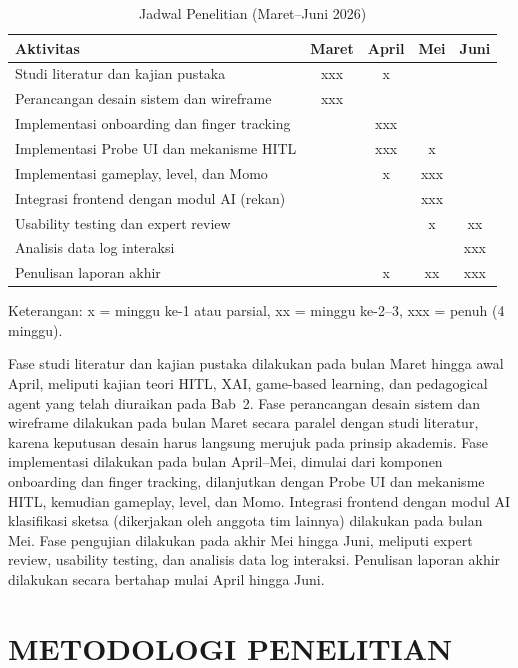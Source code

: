 \documentclass[10pt,twoside,openright]{report}
\begin{document}
\begin{table}[H]
\centering
\caption{Jadwal Penelitian (Maret--Juni 2026)}
\label{tab:jadwal-penelitian}
\begin{tabular}{|l|c|c|c|c|}
\hline
\textbf{Aktivitas} & \textbf{Maret} & \textbf{April} & \textbf{Mei} & \textbf{Juni} \\ \hline
Studi literatur dan kajian pustaka & xxx & x & & \\ \hline
Perancangan desain sistem dan wireframe & xxx & & & \\ \hline
Implementasi onboarding dan finger tracking & & xxx & & \\ \hline
Implementasi Probe UI dan mekanisme HITL & & xxx & x & \\ \hline
Implementasi gameplay, level, dan Momo & & x & xxx & \\ \hline
Integrasi frontend dengan modul AI (rekan) & & & xxx & \\ \hline
Usability testing dan expert review & & & x & xx \\ \hline
Analisis data log interaksi & & & & xxx \\ \hline
Penulisan laporan akhir & & x & xx & xxx \\ \hline
\end{tabular}
\end{table}

Keterangan: x = minggu ke-1 atau parsial, xx = minggu ke-2--3, xxx = penuh (4 minggu).

Fase studi literatur dan kajian pustaka dilakukan pada bulan Maret hingga awal April, meliputi kajian teori HITL, XAI, game-based learning, dan pedagogical agent yang telah diuraikan pada Bab~2. Fase perancangan desain sistem dan wireframe dilakukan pada bulan Maret secara paralel dengan studi literatur, karena keputusan desain harus langsung merujuk pada prinsip akademis. Fase implementasi dilakukan pada bulan April--Mei, dimulai dari komponen onboarding dan finger tracking, dilanjutkan dengan Probe UI dan mekanisme HITL, kemudian gameplay, level, dan Momo. Integrasi frontend dengan modul AI klasifikasi sketsa (dikerjakan oleh anggota tim lainnya) dilakukan pada bulan Mei. Fase pengujian dilakukan pada akhir Mei hingga Juni, meliputi expert review, usability testing, dan analisis data log interaksi. Penulisan laporan akhir dilakukan secara bertahap mulai April hingga Juni.


\section{METODOLOGI PENELITIAN}
\label{sec:metodologi-penelitian}
\end{document}
